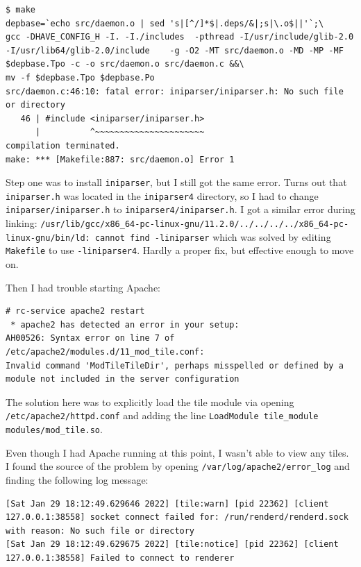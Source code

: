 \documentclass{article}
\begin{document}
\begin{verbatim}
$ make
depbase=`echo src/daemon.o | sed 's|[^/]*$|.deps/&|;s|\.o$||'`;\
gcc -DHAVE_CONFIG_H -I. -I./includes  -pthread -I/usr/include/glib-2.0 -I/usr/lib64/glib-2.0/include    -g -O2 -MT src/daemon.o -MD -MP -MF $depbase.Tpo -c -o src/daemon.o src/daemon.c &&\
mv -f $depbase.Tpo $depbase.Po
src/daemon.c:46:10: fatal error: iniparser/iniparser.h: No such file or directory
   46 | #include <iniparser/iniparser.h>
      |          ^~~~~~~~~~~~~~~~~~~~~~~
compilation terminated.
make: *** [Makefile:887: src/daemon.o] Error 1
\end{verbatim}

Step one was to install \texttt{iniparser}, but I still got the same error.  Turns out that \texttt{iniparser.h} was located in the \texttt{iniparser4} directory, so I had to change \texttt{iniparser/iniparser.h} to \texttt{iniparser4/iniparser.h}.  I got a similar error during linking: \texttt{/usr/lib/gcc/x86_64-pc-linux-gnu/11.2.0/../../../../x86_64-pc-linux-gnu/bin/ld: cannot find -liniparser} which was solved by editing \texttt{Makefile} to use \texttt{-liniparser4}.  Hardly a proper fix, but effective enough to move on.

Then I had trouble starting Apache:

\begin{verbatim}
# rc-service apache2 restart
 * apache2 has detected an error in your setup:
AH00526: Syntax error on line 7 of /etc/apache2/modules.d/11_mod_tile.conf:
Invalid command 'ModTileTileDir', perhaps misspelled or defined by a module not included in the server configuration
\end{verbatim}

The solution here was to explicitly load the tile module via opening \texttt{/etc/apache2/httpd.conf} and adding the line \texttt{LoadModule tile_module modules/mod_tile.so}.

Even though I had Apache running at this point, I wasn't able to view any tiles.  I found the source of the problem by opening \texttt{/var/log/apache2/error_log} and finding the following log message:

\begin{verbatim}
[Sat Jan 29 18:12:49.629646 2022] [tile:warn] [pid 22362] [client 127.0.0.1:38558] socket connect failed for: /run/renderd/renderd.sock with reason: No such file or directory
[Sat Jan 29 18:12:49.629675 2022] [tile:notice] [pid 22362] [client 127.0.0.1:38558] Failed to connect to renderer
\end{verbatim}
\end{document}
